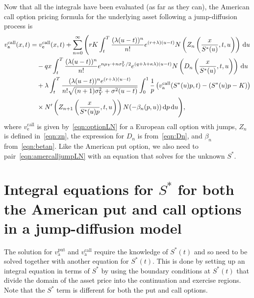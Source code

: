 		Now that all the integrals have been evaluated (as far as they can), the American call option pricing formula for the underlying asset following a jump-diffusion process is
		\begin{equation}
			\label{eqn:amercalljumpLN}
			\begin{split}
				 v_{\text{a}}^{\text{call}}(x,t) &=  v_{\text{e}}^{\text{call}}(x,t) + \displaystyle\sum\limits_{n=0}^\infty \Bigg( rK\int_t^T  \frac{(\lambda(u-t))^n}{n!} e^{(r+\lambda)(u-t)} N\left(Z_n \left( \frac{x}{S^*(u)},t,u  \right) \right) \, \mathrm d u \\
				 &\quad{} -qx \int_t^T   \frac{(\lambda(u-t))^n}{n!} e^{n\mu_Y + n\sigma_Y^2/2} e^{(q+\lambda + \kappa\lambda)(u-t)} N\left( D_n \left( \frac{x}{S^*(u)},t,u  \right) \right) \, \mathrm d u \\
				&\quad{} +  \lambda \int_t^T  \frac{(\lambda(u-t))^ne^{(r+\lambda)(u-t)}}{n!\sqrt{(n+1)\sigma_Y^2 + \sigma^2(u-t)}}\int_0^1 \frac{1}{p}\left( v_{\text{a}}^{\text{call}}(S^*(u)p,t) - (S^*(u)p - K) \right) \\
			&\quad {} \times N'\left( Z_{n+1}\left( \frac{x}{S^*(u)p}, t, u \right)\right)N(-\beta_n(p,u))  \, \mathrm d p \, \mathrm d u  \Bigg),
			\end{split}
		\end{equation}
		where $v_{\text{e}}^{\text{call}}$ is given by~\eqref{eqn:optionLN} for a European call option with jumps, $Z_n$ is defined in~\eqref{eqn:zn}, the expression for $D_n$ is from~\eqref{eqn:Dn}, and $\beta_n$ from~\eqref{eqn:betan}. Like the American put option, we also need to pair~\eqref{eqn:amercalljumpLN} with an equation that solves for the unknown $S^*$.
		

		
		
        	\section{Integral equations for $S^*$ for both the American put and call options in a jump-diffusion model}
		\label{sec:intS}
        	
        	The solution for $v_{\text{a}}^{\text{put}}$ and $v_{\text{a}}^{\text{call}}$ require the knowledge of $S^*(t)$ and so need to be solved together with another equation for $S^*(t)$. This is done by setting up an integral equation in terms of $S^*$ by using the boundary conditions at $S^*(t)$ that divide the domain of the asset price into the continuation and exercise regions. Note that the $S^*$ term is different for both the put and call options. 
        	
